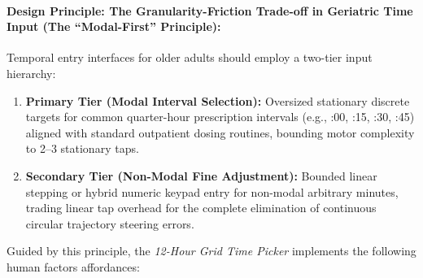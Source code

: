 \documentclass[11pt,a4paper]{article}
\begin{document}
\paragraph{Design Principle: The Granularity-Friction Trade-off in Geriatric Time Input (The ``Modal-First'' Principle):}
Temporal entry interfaces for older adults should employ a two-tier input hierarchy:
\begin{enumerate}
    \item \textbf{Primary Tier (Modal Interval Selection):} Oversized stationary discrete targets for common quarter-hour prescription intervals (e.g., :00, :15, :30, :45) aligned with standard outpatient dosing routines, bounding motor complexity to 2--3 stationary taps.
    \item \textbf{Secondary Tier (Non-Modal Fine Adjustment):} Bounded linear stepping or hybrid numeric keypad entry for non-modal arbitrary minutes, trading linear tap overhead for the complete elimination of continuous circular trajectory steering errors.
\end{enumerate}

Guided by this principle, the \emph{12-Hour Grid Time Picker} implements the following human factors affordances:
\end{document}
